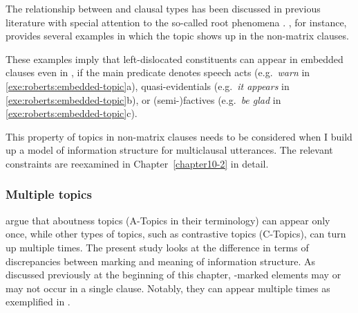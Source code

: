 The relationship between  and clausal types has been discussed in
previous literature with special attention to the so-called root
phenomena
\citep{haegeman:04,heycock:07,bianchi:frascarelli:10,roberts:11}.
\citeauthor{roberts:11}, for instance, provides several 
examples in which the topic shows up in the non-matrix clauses.



\noindent These examples imply that left-dislocated constituents can
appear in embedded clauses even in , if the main
predicate denotes speech acts (e.g.\ \textit{warn} in
\ref{exe:roberts:embedded-topic}a), quasi-evidentials
(e.g.\ \textit{it appears} in \ref{exe:roberts:embedded-topic}b), or
(semi-)factives (e.g.\ \textit{be glad} in
\ref{exe:roberts:embedded-topic}c).



This property of topics in non-matrix clauses needs to be considered
when I build up a model of information structure for multiclausal
utterances. The relevant constraints are reexamined in
Chapter~\ref{chapter10-2} in detail.




\subsubsection{Multiple topics}
\label{3:sssec:multiple-topics}

\citet{bianchi:frascarelli:10} argue that aboutness topics (A-Topics
in their terminology) can appear only once, while other types of
topics, such as contrastive topics (C-Topics), can turn up multiple
times.  The present study looks at the difference in terms of
discrepancies between marking and meaning of information structure.
As discussed previously at the beginning of this chapter, -marked
elements may or may not occur in a single clause. Notably, they can
appear multiple times as exemplified in
.

